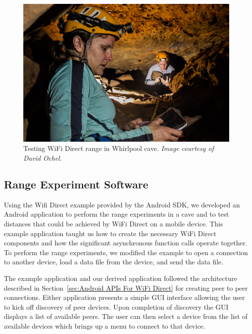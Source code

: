 \documentclass[10pt,twocolumn]{article}
\begin{document}
\begin{figure}
\includegraphics[width=\columnwidth]{cavewifi}
\caption{Testing WiFi Direct range in Whirlpool cave. \textit{Image courtesy of David Ochel.}}
\end{figure}


\subsection{Range Experiment Software}
\label{sec:Range Experiment Software}
Using the Wifi Direct example provided by the Android SDK, 
we developed an Android application to perform the range experiments in a cave and to test distances that could be achieved by WiFi Direct on a mobile device.
This example application taught us how to create the necessary WiFi Direct components and how the significant asynchronous function calls operate together.
To perform the range experiments, we modified the example to open a connection to another device, load a data file from the device, and send the data file. 

The example application and our derived application followed the architecture described in Section~\ref{sec:Android APIs For WiFi Direct} for creating peer to peer connections. 
Either application presents a simple GUI interface allowing the user to kick off discovery of peer devices. 
Upon completion of discovery the GUI displays a list of available peers.
The user can then select a device from the list of available devices which brings up a menu to connect to that device.
\end{document}
